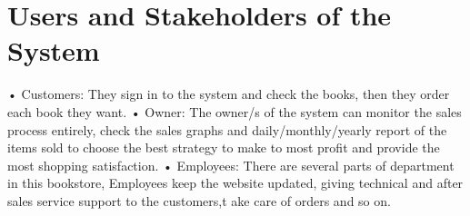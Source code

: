 \section{Users and Stakeholders of the System}
•	Customers: They sign in to the system and check the books, then they order each book they want.
•	Owner: The owner/s of the system can monitor the sales process entirely, check the sales graphs and daily/monthly/yearly report of the items sold to choose the best strategy to make to most profit and provide the most shopping satisfaction.
•	Employees: There are several parts of department in this bookstore, Employees keep the website updated, giving technical and after sales service support to the customers,t ake care of orders and so on.
